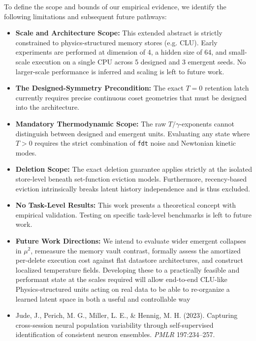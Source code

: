 \documentclass{article}
\begin{document}
To define the scope and bounds of our empirical evidence, we identify the following limitations and subsequent future pathways:
\begin{itemize}
    \item \textbf{Scale and Architecture Scope:} This extended abstract is strictly constrained to physics-structured memory stores (e.g. CLU). Early experiments are performed at dimension of 4, a hidden size of 64, and small-scale execution on a single CPU across 5 designed and 3 emergent seeds. No larger-scale performance is inferred and scaling is left to future work.
    \item \textbf{The Designed-Symmetry Precondition:} The exact $T=0$ retention latch currently requires precise continuous coset geometries that must be designed into the architecture.
    \item \textbf{Mandatory Thermodynamic Scope:} The raw $T/\gamma$-exponents cannot distinguish between designed and emergent units. Evaluating any state where $T>0$ requires the strict combination of \texttt{fdt} noise and Newtonian kinetic modes.
    \item \textbf{Deletion Scope:} The exact deletion guarantee applies strictly at the isolated store-level beneath set-function eviction models. Furthermore, recency-based eviction intrinsically breaks latent history independence and is thus excluded.
    \item \textbf{No Task-Level Results:} This work presents a theoretical concept with empirical validation. Testing on specific task-level benchmarks is left to future work.
    \item \textbf{Future Work Directions:} We intend to evaluate wider emergent collapses in $\mu^2$, remeasure the memory vault contrast, formally assess the amortized per-delete execution cost against flat datastore architectures, and construct localized temperature fields. Developing these to a practically feasible  and performant state at the scales required will allow end-to-end CLU-like Physics-structured units acting on real data to be able to re-organize a learned latent space in both a useful and controllable way
\end{itemize}



\begin{itemize}
\item Jude, J., Perich, M. G., Miller, L. E., \& Hennig, M. H. (2023). Capturing cross-session neural population variability through self-supervised identification of consistent neuron ensembles. \emph{PMLR} 197:234--257.
\end{itemize}
\end{document}

